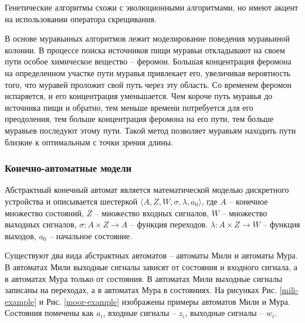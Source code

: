 \documentclass[14pt]{article}
\begin{document}
Генетические алгоритмы схожи с эволюционными алгоритмами, но имеют акцент на
использовании оператора скрещивания.

В основе муравьиных алгоритмов лежит моделирование поведения муравьиной колонии.
В процессе поиска источников пищи муравьи откладывают на своем пути особое
химическое вещество -- феромон. Большая концентрация феромона на определенном участке пути
муравья привлекает его, увеличивая вероятность того, что муравей проложит свой путь через
эту область. Со временем феромон испаряется, и его концентрация уменьшается. Чем короче
путь муравья до источника пищи и обратно, тем меньше времени потребуется для его преодоления,
тем больше концентрация феромона на его пути, тем больше муравьев последуют этому пути.
Такой метод позволяет муравьям находить пути близкие к оптимальным с точки зрения длины.

\subsubsection{Конечно-автоматные модели}

Абстрактный конечный автомат является математической моделью дискретного устройства
и описывается шестеркой $\langle A, Z, W, \sigma, \lambda, a_0 \rangle$,
где $A$ -- конечное множество состояний, $Z$ -- множество входных сигналов,
$W$ -- множество выходных сигналов, $\sigma : A \times Z \rightarrow A$ --
функция переходов. $\lambda : A \times Z \rightarrow W$ -- функция выходов,
$a_0$  -- начальное состояние.

Существуют два вида абстрактных автоматов -- автоматы Мили и автоматы Мура.
В автоматах Мили выходные сигналы зависят от состояния и входного сигнала,
а в автоматах Мура только от состояния. В автоматах Мили
выходные сигналы записаны на переходах, а в автоматах Мура в состояниях.
На рисунках Рис. \ref{mili-example} и Рис. \ref{moor-example} изображены примеры
автоматов Мили и Мура. Состояния помечены как $a_i$, входные сигналы --
$z_i$, выходные сигналы -- $w_i$.
\end{document}
